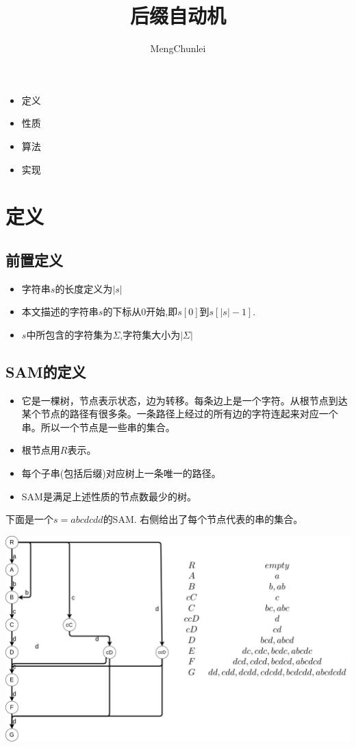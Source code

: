 \documentclass{article}
\title{后缀自动机}
\author{MengChunlei}
\begin{document}
\maketitle
\begin{itemize}
	\item 定义
	\item 性质
	\item 算法
	\item 实现
\end{itemize}
\section{定义}
\subsection{前置定义}
\begin{itemize}
	\item 字符串$s$的长度定义为$|s|$
	\item 本文描述的字符串$s$的下标从0开始,即$s[0]$到$s[|s|-1]$.
	\item $s$中所包含的字符集为$\Sigma$,字符集大小为$|\Sigma |$
\end{itemize}
\subsection{SAM的定义}
\begin{itemize}
	\item 它是一棵树，节点表示状态，边为转移。每条边上是一个字符。从根节点到达某个节点的路径有很多条。一条路径上经过的所有边的字符连起来对应一个串。所以一个节点是一些串的集合。
	\item 根节点用$R$表示。
	\item 每个子串(包括后缀)对应树上一条唯一的路径。
	\item SAM是满足上述性质的节点数最少的树。
\end{itemize}
下面是一个$s=abcdcdd$的SAM. 右侧给出了每个节点代表的串的集合。 \par
\includegraphics[scale=0.35]{pic1.png} \par
\end{document}

